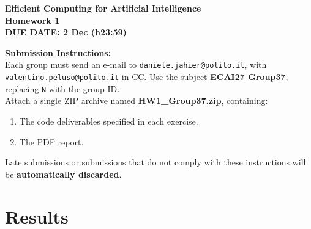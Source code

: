 \documentclass[a4paper,11pt]{article}
\begin{document}
\begin{tcolorbox}[
    colback=white,
    colframe=black,
    width=\textwidth,
    arc=3mm,
    boxrule=1pt
]
\begin{center}
    \Large \textbf{Efficient Computing for Artificial Intelligence}\\[3pt]
    \large \textbf{Homework 1}\\[5pt]
    \textbf{\colorbox{yellow!30}{DUE DATE: 2 Dec (h23:59)}}\\[8pt]
\end{center}

\textbf{Submission Instructions:}\\[3pt]

Each group must send an e-mail to
\texttt{daniele.jahier@polito.it}, with
\texttt{valentino.peluso@polito.it} in CC.
Use the subject
\textbf{ECAI27 Group37}, replacing \texttt{N} with
the group ID.\\[3pt]

Attach a single ZIP archive named
\textbf{HW1\_Group37.zip}, containing:
\begin{enumerate}
    \item The code deliverables specified in each exercise.
    \item The PDF report.
\end{enumerate}

Late submissions or submissions that do not comply with these
instructions will be \textbf{automatically discarded}.
\end{tcolorbox}


\section*{Results}
\end{document}
